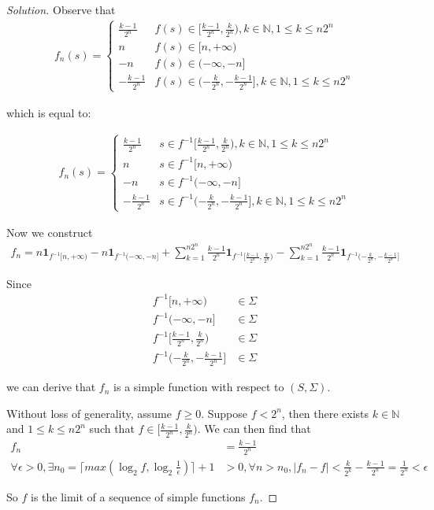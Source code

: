 \documentclass[a4paper, linespread=1.5]{article}
\begin{document}
    \begin{proof}[Solution]
    	Observe that
    	\begin{align*}
    		f_n(s)=\begin{cases}
    		\frac{k-1}{2^n}& f(s)\in [\frac{k-1}{2^n},\frac{k}{2^n}), k\in \mathbb{N}, 1\le k \le n2^n \\
    		n& f(s)\in [n,+\infty) \\
    		-n& f(s)\in (-\infty,-n] \\
    		-\frac{k-1}{2^n}& f(s)\in (-\frac{k}{2^n},-\frac{k-1}{2^n}], k\in \mathbb{N}, 1\le k \le n2^n
    		\end{cases}
    	\end{align*}
    	
    	which is equal to:
    	
    	\begin{align*}
   			f_n(s)=\begin{cases}
    		\frac{k-1}{2^n}& s\in f^{-1}[\frac{k-1}{2^n},\frac{k}{2^n}), k\in \mathbb{N}, 1\le k \le n2^n \\
    		n& s\in f^{-1}[n,+\infty) \\
    		-n&  s\in f^{-1}(-\infty,-n] \\
    		-\frac{k-1}{2^n}& s\in f^{-1} (-\frac{k}{2^n},-\frac{k-1}{2^n}], k\in \mathbb{N}, 1\le k \le n2^n
    		\end{cases}
    	\end{align*}
    	
    	Now we construct 
    	\begin{align*}
    		f_n=n\mathbf{1}_{f^{-1}[n,+\infty)}
    		-n\mathbf{1}_{f^{-1}(-\infty,-n]}
    		+\sum\limits_{k=1}^{n2^n}\frac{k-1}{2^n}\mathbf{1}_{f^{-1}[\frac{k-1}{2^n},\frac{k}{2^n})}
    		-\sum\limits_{k=1}^{n2^n}\frac{k-1}{2^n}\mathbf{1}_{f^{-1} (-\frac{k}{2^n},-\frac{k-1}{2^n}]}
    	\end{align*}
    	
    	Since 
    	\begin{align*}
    		f^{-1}[n,+\infty)&\in \Sigma \\
    		f^{-1}(-\infty,-n] &\in \Sigma \\
    		f^{-1}[\frac{k-1}{2^n},\frac{k}{2^n}) &\in \Sigma\\
    		f^{-1} (-\frac{k}{2^n},-\frac{k-1}{2^n}] &\in \Sigma
    	\end{align*}
    	
    	we can derive that $f_n$ is a simple function with respect to $(S,\Sigma)$.
    	
    	Without loss of generality, assume $f\ge0$.
    	Suppose $f<2^n$, then there exists $k\in\mathbb{N}$ and $1\le k \le n2^n$ such that $f \in[\frac{k-1}{2^n},\frac{k}{2^n}) $. We can then find that
    	\begin{align*}
    		f_n&=\frac{k-1}{2^n}\\
    		\forall \epsilon>0,\exists n_0=\lceil max(\log_{2}f,\log_{2}\frac{1}{\epsilon})\rceil+1&>0,\forall n>n_0,|f_n-f|<\frac{k}{2^k}-\frac{k-1}{2^n}=\frac{1}{2^n}<\epsilon
    	\end{align*}
    	
    	So $f$ is the limit of a sequence of simple functions $f_n$.
    	
    	
    \end{proof}
    
\end{document}
